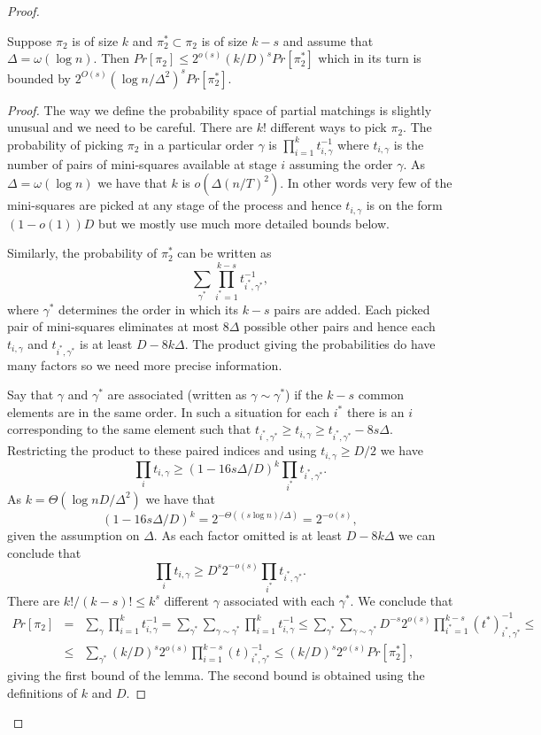 \documentclass{theoretics}
\begin{document}
\begin{proof}
\begin{lemma}\label{lemma:pi2}
Suppose $\pi_2$ is of size $k$ and $\pi_2^* \subset \pi_2$
is of size $k-s$ and assume that $\Delta= \omega (\log n)$.
Then $Pr [\pi_2] \leq 2^{o(s)}(k/D)^s Pr[\pi_2^*]$
which in its turn is bounded by $2^{O(s)}(\log n/\Delta^2)^s Pr[\pi_2^*]$.
\end{lemma}

\begin{proof}
The way we define the probability space of partial matchings
is slightly unusual and we need to be careful.
There are $k!$ different ways to pick $\pi_2$.
The probability of picking $\pi_2$ in a particular
order $\gamma$ is $\prod_{i=1}^k t_{i,\gamma}^{-1}$ where $t_{i,\gamma}$ 
is the number of pairs of mini-squares available at stage $i$
assuming the order $\gamma$.  As $\Delta = \omega (\log n)$
we have that $k$ is $o( \Delta (n/T)^2)$.  In other words very few of the
mini-squares are picked at any stage of the process
and hence $t_{i,\gamma}$ is on the
form $(1-o(1))D$ but we mostly use much more detailed bounds below.

Similarly, the probability of $\pi_2^*$ can be written as
$$
\sum_{\gamma^*} \prod_{i^*=1}^{k-s} t_{i^*, \gamma^*}^{-1},
$$
where $\gamma^*$ determines the order in which its $k-s$
pairs are added.  
Each picked pair of mini-squares eliminates at most $8 \Delta$ possible
other pairs and hence each $t_{i,\gamma}$ and $t_{i^*,\gamma^*}$ is
at least  $D-8k\Delta$.
The product giving the probabilities do have
many factors so we need more precise information.

Say that $\gamma$ and $\gamma^*$ are associated (written
as $\gamma \sim \gamma^*$) if the $k-s$ common elements
are in the same order.  In such
a situation for each $i^*$ there is an $i$ corresponding
to the same element such that $t_{i^*,\gamma^*} \geq t_{i,\gamma}
 \geq t_{i^*, \gamma^*} -8s\Delta$.
Restricting the product to these paired
indices and using $t_{i,\gamma} \geq D/2$ we have
$$
\prod_{i} t_{i,\gamma} \geq (1-16s \Delta /D)^k \prod_{i^*} t_{i^*,\gamma^*}.
$$
As $k = \Theta( \log n D /\Delta^2)$ we have that
$$(1-16s \Delta /D)^k = 2^{-\Theta ( (s\log n)/\Delta)} = 2^{-o(s)},$$
given the assumption on $\Delta$.
As each factor omitted is at least $D-8k \Delta$ we 
can conclude that 
$$
\prod_{i} t_{i,\gamma} \geq D^s 2^{-o(s)} \prod_{i^*} t_{i^*,\gamma^*}.
$$
There are $k! /(k-s)! \leq k^s $  different $\gamma$ associated
with each $\gamma^*$.  We conclude that
\begin{eqnarray*}
Pr[\pi_2] & =& \sum_{\gamma} \prod_{i=1}^k t_{i,\gamma}^{-1}
= \sum_{\gamma^*} \sum_{\gamma \sim \gamma^*}
\prod_{i=1}^k t_{i,\gamma}^{-1} \leq 
\sum_{\gamma^*} \sum_{\gamma \sim \gamma^*}
D^{-s}  2^{o(s)} \prod_{i^*=1}^{k-s} (t^*)_{i^*,\gamma^*}^{-1} \leq \\
&\leq & \sum_{\gamma^*} 
(k/D)^{s}  2^{o(s)}
\prod_{i=1}^{k-s} (t)_{i^*,\gamma^*}^{-1} \leq 
(k/D)^{s}  2^{o(s)} Pr[\pi_2^*],
\end{eqnarray*}
giving the first bound of the lemma.  The second bound is obtained
using the definitions of $k$ and $D$.
\end{proof}


\end{proof}
\end{document}
